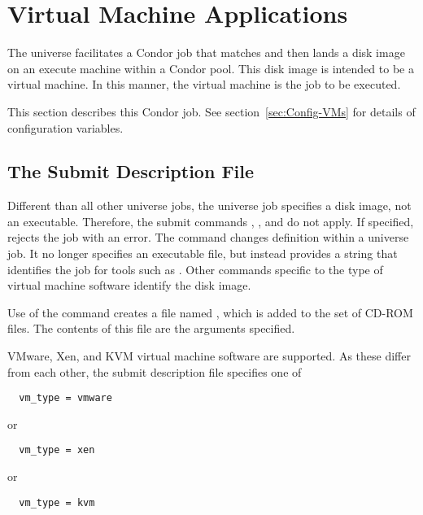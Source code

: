 \section{\label{sec:vmuniverse}Virtual Machine Applications}

The  universe facilitates a Condor job
that matches and then lands a disk image on an execute machine
within a Condor pool.
This disk image is intended to be a virtual machine.
In this manner, the virtual machine is the job to be executed.

This section describes this Condor job.
See section~\ref{sec:Config-VMs}
for details of configuration variables.

\subsection{\label{sec:vm-submitfile}The Submit Description File}

Different than all other universe jobs,
the  universe job specifies a disk image,
not an executable.
Therefore, the submit commands , ,
and  do not apply.
If specified,  rejects the job with an error.
The  command changes definition within a
 universe job.
It no longer specifies an executable file, but instead
provides a string that identifies the job for tools such
as .
Other commands specific to the type of virtual machine software
identify the disk image.

Use of the  command creates a file named ,
which is added to the set of CD-ROM files.
The contents of this file are the arguments specified.

VMware, Xen, and KVM virtual machine software are supported.
As these differ from each other, the submit description file
specifies one of
\begin{verbatim}
  vm_type = vmware
\end{verbatim}
or
\begin{verbatim}
  vm_type = xen
\end{verbatim}
or
\begin{verbatim}
  vm_type = kvm
\end{verbatim}

